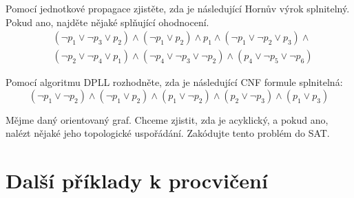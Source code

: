\documentclass[a4paper,11pt]{amsart}
\begin{document}
\begin{problem}

    Pomocí jednotkové propagace zjistěte, zda je následující Hornův výrok splnitelný. Pokud ano, najděte nějaké splňující ohodnocení.
    \begin{align*}
        &(\neg p_1 \vee \neg p_3 \vee p_2)\wedge(\neg p_1 \vee p_2)\wedge p_1 \wedge (\neg p_1 \vee \neg p_2 \vee p_3)\wedge \\
        &(\neg p_2 \vee \neg p_4 \vee p_1)\wedge(\neg p_4 \vee \neg p_3 \vee \neg p_2)\wedge(p_4\vee \neg p_5 \vee\neg p_6)
    \end{align*}

    \begin{solution}
                
    \end{solution}
    
\end{problem}


\begin{problem} \label{problem:dpll}

    Pomocí algoritmu DPLL rozhodněte, zda je následující CNF formule splnitelná:
    $$ 
    (\neg p_1 \lor \neg p_2)\land( \neg p_1 \lor p_2)\land( p_1 \lor \neg p_2)\land( p_2 \lor \neg p_3)\land( p_1 \lor p_3)
    $$

    \begin{solution}
                
    \end{solution}

\end{problem}


\begin{problem}

    Mějme daný orientovaný graf. Chceme zjistit, zda je acyklický, a pokud ano, nalézt nějaké jeho topologické uspořádání. Zakódujte tento problém do SAT.

\end{problem}
    
    
\section*{Další příklady k procvičení}
    
\end{document}
